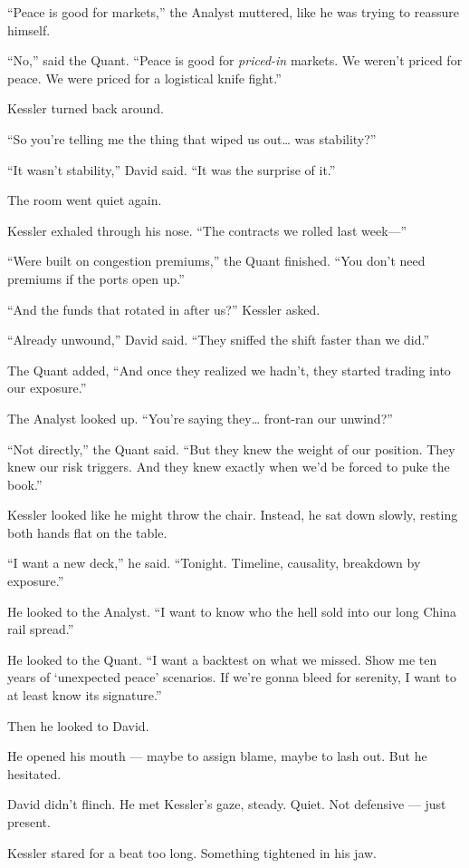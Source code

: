 “Peace is good for markets,” the Analyst muttered, like he was trying to reassure himself.

“No,” said the Quant. “Peace is good for \textit{priced-in} markets. We weren’t priced for peace. We were priced for a logistical knife fight.”

Kessler turned back around.

“So you’re telling me the thing that wiped us out… was stability?”

“It wasn’t stability,” David said. “It was the surprise of it.”

The room went quiet again.

Kessler exhaled through his nose. “The contracts we rolled last week—”

“Were built on congestion premiums,” the Quant finished. “You don’t need premiums if the ports open up.”

“And the funds that rotated in after us?” Kessler asked.

“Already unwound,” David said. “They sniffed the shift faster than we did.”

The Quant added, “And once they realized we hadn’t, they started trading into our exposure.”

The Analyst looked up. “You’re saying they… front-ran our unwind?”

“Not directly,” the Quant said. “But they knew the weight of our position. They knew our risk triggers. And they knew exactly when we’d be forced to puke the book.”

Kessler looked like he might throw the chair. Instead, he sat down slowly, resting both hands flat on the table.

“I want a new deck,” he said. “Tonight. Timeline, causality, breakdown by exposure.”

He looked to the Analyst. “I want to know who the hell sold into our long China rail spread.”

He looked to the Quant. “I want a backtest on what we missed. Show me ten years of ‘unexpected peace’ scenarios. If we’re gonna bleed for serenity, I want to at least know its signature.”

Then he looked to David.

He opened his mouth — maybe to assign blame, maybe to lash out. But he hesitated.

David didn’t flinch. He met Kessler’s gaze, steady. Quiet. Not defensive — just present.

Kessler stared for a beat too long. Something tightened in his jaw.

